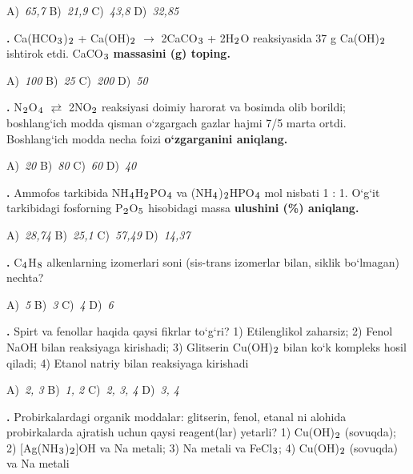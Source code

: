 \documentclass[11pt,a4paper]{article}
\renewcommand{\textsubscript}[1]{\ensuremath{_{\text{\fontsize{8}{8}\selectfont #1}}}}
\newcommand{\qn}[1]{\textbf{\fontsize{11.5}{13}\selectfont #1}}
\newcommand{\qsep}{\par\vspace{13pt}}
\begin{document}
\begin{multicols}{2}
\noindent A)~\textsl{65,7} \hfill B)~\textsl{21,9} \hfill C)~\textsl{43,8} \hfill D)~\textsl{32,85}\par
\qsep
\noindent\qn{17.} Ca(HCO\textsubscript{3})\textsubscript{2} + Ca(OH)\textsubscript{2} $\to$ 2CaCO\textsubscript{3} + 2H\textsubscript{2}O reaksiyasida 37 g Ca(OH)\textsubscript{2} ishtirok etdi. CaCO\textsubscript{3} \textbf{massasini (g) toping.}

\noindent A)~\textsl{100} \hfill B)~\textsl{25} \hfill C)~\textsl{200} \hfill D)~\textsl{50}\par
\qsep
\noindent\qn{18.} N\textsubscript{2}O\textsubscript{4} $\rightleftarrows$ 2NO\textsubscript{2} reaksiyasi doimiy harorat va bosimda olib borildi; boshlang`ich modda qisman o`zgargach gazlar hajmi 7/5 marta ortdi. Boshlang`ich modda necha foizi \textbf{o`zgarganini aniqlang.}

\noindent A)~\textsl{20} \hfill B)~\textsl{80} \hfill C)~\textsl{60} \hfill D)~\textsl{40}\par
\qsep
\noindent\qn{19.} Ammofos tarkibida NH\textsubscript{4}H\textsubscript{2}PO\textsubscript{4} va (NH\textsubscript{4})\textsubscript{2}HPO\textsubscript{4} mol nisbati 1 : 1. O`g`it tarkibidagi fosforning P\textsubscript{2}O\textsubscript{5} hisobidagi massa \textbf{ulushini (\%) aniqlang.}

\noindent A)~\textsl{28,74} \hfill B)~\textsl{25,1} \hfill C)~\textsl{57,49} \hfill D)~\textsl{14,37}\par
\qsep
\noindent\qn{20.} C\textsubscript{4}H\textsubscript{8} alkenlarning izomerlari soni (sis-trans izomerlar bilan, siklik bo`lmagan) nechta?

\noindent A)~\textsl{5} \hfill B)~\textsl{3} \hfill C)~\textsl{4} \hfill D)~\textsl{6}\par
\qsep
\noindent\qn{21.} Spirt va fenollar haqida qaysi fikrlar to`g`ri? 1) Etilenglikol zaharsiz; 2) Fenol NaOH bilan reaksiyaga kirishadi; 3) Glitserin Cu(OH)\textsubscript{2} bilan ko`k kompleks hosil qiladi; 4) Etanol natriy bilan reaksiyaga kirishadi

\noindent A)~\textsl{2, 3} \hfill B)~\textsl{1, 2} \hfill C)~\textsl{2, 3, 4} \hfill D)~\textsl{3, 4}\par
\qsep
\noindent\qn{22.} Probirkalardagi organik moddalar: glitserin, fenol, etanal ni alohida probirkalarda ajratish uchun qaysi reagent(lar) yetarli? 1) Cu(OH)\textsubscript{2} (sovuqda); 2) [Ag(NH\textsubscript{3})\textsubscript{2}]OH va Na metali; 3) Na metali va FeCl\textsubscript{3}; 4) Cu(OH)\textsubscript{2} (sovuqda) va Na metali


\end{multicols}
\end{document}
